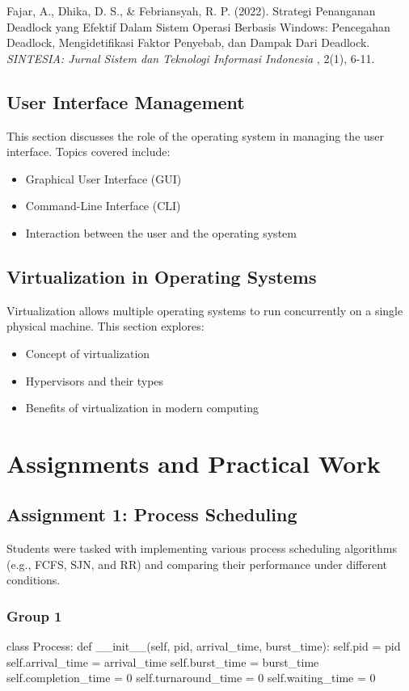 \documentclass[12pt]{article}
\begin{document}
\begin{thebibliography}{5}
    \bibitem  {} Fajar, A., Dhika, D. S., & Febriansyah, R. P. (2022). Strategi Penanganan Deadlock yang Efektif Dalam Sistem Operasi Berbasis Windows: Pencegahan Deadlock, Mengidetifikasi Faktor Penyebab, dan Dampak Dari Deadlock. \textit{SINTESIA: Jurnal Sistem dan Teknologi Informasi Indonesia} , 2(1), 6-11.
    

    \end{thebibliography}


\subsection{User Interface Management}
This section discusses the role of the operating system in managing the user interface. Topics covered include:
\begin{itemize}
    \item Graphical User Interface (GUI)
    \item Command-Line Interface (CLI)
    \item Interaction between the user and the operating system
\end{itemize}

\subsection{Virtualization in Operating Systems}
Virtualization allows multiple operating systems to run concurrently on a single physical machine. This section explores:
\begin{itemize}
    \item Concept of virtualization
    \item Hypervisors and their types
    \item Benefits of virtualization in modern computing
\end{itemize}

\section{Assignments and Practical Work}
\subsection{Assignment 1: Process Scheduling}
Students were tasked with implementing various process scheduling algorithms (e.g., FCFS, SJN, and RR) and comparing their performance under different conditions.
\subsubsection{Group 1}
\begin{python}
    class Process:
    def __init__(self, pid, arrival_time, burst_time):
        self.pid = pid
        self.arrival_time = arrival_time
        self.burst_time = burst_time
        self.completion_time = 0
        self.turnaround_time = 0
        self.waiting_time = 0
\end{python}
\end{document}
